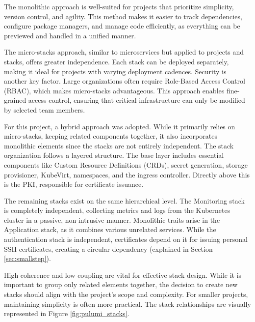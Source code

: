 The monolithic approach is well-suited for projects that prioritize simplicity, version control, and agility. This method makes it easier to track dependencies, configure package managers, and manage code efficiently, as everything can be previewed and handled in a unified manner.

The micro-stacks approach, similar to microservices but applied to projects and stacks, offers greater independence. Each stack can be deployed separately, making it ideal for projects with varying deployment cadences. Security is another key factor. Large organizations often require Role-Based Access Control (RBAC), which makes micro-stacks advantageous. This approach enables fine-grained access control, ensuring that critical infrastructure can only be modified by selected team members.

For this project, a hybrid approach was adopted. While it primarily relies on micro-stacks, keeping related components together, it also incorporates monolithic elements since the stacks are not entirely independent. The stack organization follows a layered structure. The base layer includes essential components like Custom Resource Definitions (CRDs), secret generation, storage provisioner, KubeVirt, namespaces, and the ingress controller. Directly above this is the PKI, responsible for certificate issuance. 

The remaining stacks exist on the same hierarchical level. The Monitoring stack is completely independent, collecting metrics and logs from the Kubernetes cluster in a passive, non-intrusive manner. Monolithic traits arise in the Application stack, as it combines various unrelated services. While the authentication stack is independent, certificates depend on it for issuing personal SSH certificates, creating a circular dependency (explained in Section \ref{sec:smallstep}).

High coherence and low coupling are vital for effective stack design. While it is important to group only related elements together, the decision to create new stacks should align with the project's scope and complexity. For smaller projects, maintaining simplicity is often more practical. The stack relationships are visually represented in Figure \ref{fig:pulumi_stacks}.

